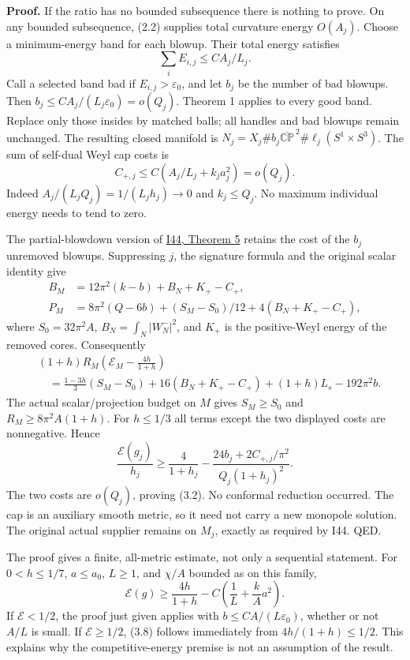 \documentclass[
  11pt,
]{article}
\begin{document}
\textbf{Proof.} If the ratio has no bounded subsequence there is nothing
to prove. On any bounded subsequence, (2.2) supplies total curvature
energy \(O(A_j)\). Choose a minimum-energy band for each blowup. Their
total energy satisfies \[
                         \sum_i E_{i,j}\le CA_j/L_j.   \tag{3.3}
\] Call a selected band bad if \(E_{i,j}>\varepsilon_0\), and let
\(b_j\) be the number of bad blowups. Then
\(b_j\le CA_j/(L_j\varepsilon_0)=o(Q_j)\). Theorem 1 applies to every
good band. Replace only those insides by matched balls; all handles and
bad blowups remain unchanged. The resulting closed manifold is
\(N_j=X_j\#b_j\overline{\mathbb{CP}}^{\,2}  \#\ell_j(S^1\times S^3)\).
The sum of self-dual Weyl cap costs is \[
 C_{+,j}\le C\left(A_j/L_j+k_j a_j^2\right)=o(Q_j).    \tag{3.4}
\] Indeed \(A_j/(L_jQ_j)=1/(L_jh_j)\to0\) and \(k_j\le Q_j\). No maximum
individual energy needs to tend to zero.

The partial-blowdown version of
\href{20260927_covering_geometry_and_sharp_subfamilies.md}{I44, Theorem
5} retains the cost of the \(b_j\) unremoved blowups. Suppressing \(j\),
the signature formula and the original scalar identity give \[
 \begin{aligned}
 B_M&=12\pi^2(k-b)+B_N+K_+-C_+,\\
 P_M&=8\pi^2(Q-6b)+(S_M-S_0)/12+4(B_N+K_+-C_+),
 \end{aligned}                                             \tag{3.5}
\] where \(S_0=32\pi^2A\), \(B_N=\int_N|W_N^-|^2\), and \(K_+\) is the
positive-Weyl energy of the removed cores. Consequently \[
\begin{aligned}
 &(1+h)R_M\left(\mathcal E_M-\frac{4h}{1+h}\right)\\
 &\quad=\frac{1-3h}{3}(S_M-S_0)+16(B_N+K_+-C_+)
                 +(1+h)L_s-192\pi^2b .
\end{aligned}                                             \tag{3.6}
\] The actual scalar/projection budget on \(M\) gives \(S_M\ge S_0\) and
\(R_M\ge8\pi^2A(1+h)\). For \(h\le1/3\) all terms except the two
displayed costs are nonnegative. Hence \[
 \frac{\mathcal E(g_j)}{h_j}\ge\frac4{1+h_j}
       -\frac{24b_j+2C_{+,j}/\pi^2}{Q_j(1+h_j)^2}.     \tag{3.7}
\] The two costs are \(o(Q_j)\), proving (3.2). No conformal reduction
occurred. The cap is an auxiliary smooth metric, so it need not carry a
new monopole solution. The original actual supplier remains on \(M_j\),
exactly as required by I44. QED.

The proof gives a finite, all-metric estimate, not only a sequential
statement. For \(0<h\le1/7\), \(a\le a_0\), \(L\ge1\), and \(\chi/A\)
bounded as on this family, \[
 \boxed{\mathcal E(g)\ge\frac{4h}{1+h}
                -C\left(\frac1L+\frac{k}{A}a^2\right).} \tag{3.8}
\] If \(\mathcal E<1/2\), the proof just given applies with
\(b\le CA/(L\varepsilon_0)\), whether or not \(A/L\) is small. If
\(\mathcal E\ge1/2\), (3.8) follows immediately from \(4h/(1+h)\le1/2\).
This explains why the competitive-energy premise is not an assumption of
the result.
\end{document}
